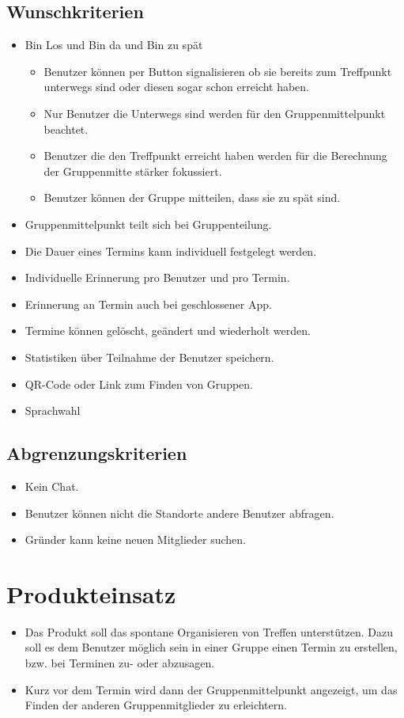 \documentclass{scrartcl}
\begin{document}
	\subsection{Wunschkriterien}
	\begin{itemize}
		\item \grqq{}Bin Los\grqq{} und \grqq{}Bin da\grqq{} und \grqq{}Bin zu spät\grqq{}
		\begin{itemize}
			\item Benutzer können per Button signalisieren ob sie bereits zum Treffpunkt unterwegs sind oder diesen sogar schon erreicht haben.
			\item Nur Benutzer die Unterwegs sind werden für den Gruppenmittelpunkt beachtet.
			\item Benutzer die den Treffpunkt erreicht haben werden für die Berechnung der Gruppenmitte stärker fokussiert.
			\item Benutzer können der Gruppe mitteilen, dass sie zu spät sind.
		\end{itemize}
		\item Gruppenmittelpunkt teilt sich bei Gruppenteilung.
		\item Die Dauer eines Termins kann individuell festgelegt werden.
		\item Individuelle Erinnerung pro Benutzer und pro Termin.
		\item Erinnerung an Termin auch bei geschlossener App.
		\item Termine können gelöscht, geändert und wiederholt werden.
		\item Statistiken über Teilnahme der Benutzer speichern.
		\item QR-Code oder Link zum Finden von Gruppen.
		\item Sprachwahl
	\end{itemize}
	\subsection{Abgrenzungskriterien}
	\begin{itemize}
		\item Kein Chat.
		\item Benutzer können nicht die Standorte andere Benutzer abfragen.
		\item Gründer kann keine neuen Mitglieder suchen.
	\end{itemize}
	
	\newpage
	
	
	
	\section{Produkteinsatz}
	\begin{itemize}	        
		\item Das Produkt soll das spontane Organisieren von Treffen unterstützen. Dazu soll es dem Benutzer möglich sein in einer Gruppe einen Termin zu erstellen, bzw. bei Terminen zu- oder abzusagen.
		\item Kurz vor dem Termin wird dann der Gruppenmittelpunkt angezeigt, um das Finden der anderen Gruppenmitglieder zu erleichtern.
	\end{itemize}
\end{document}
